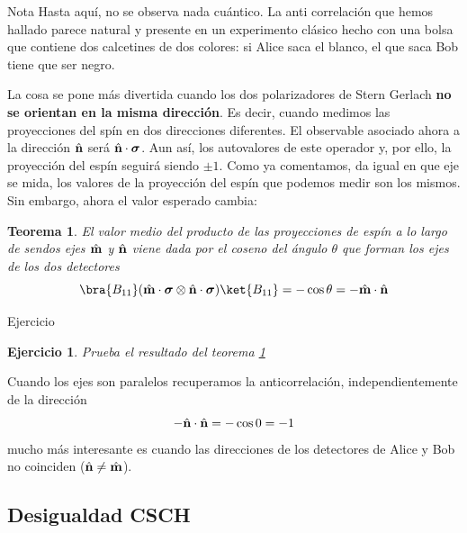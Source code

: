 \documentclass[a4paper,11pt]{book} %
\newtheorem{teorema_contador}{Teorema}
\newcommand{\Teorema}[1]{
		\begin{mybox_gray2}{}
			\begin{teorema_contador}
				 #1 
			\end{teorema_contador} 
		\end{mybox_gray2}
	}
\newtheorem{ejercicio_contador}{Ejercicio}
\newcommand{\Ejercicio}[1]{
		\begin{mybox_gray}{Ejercicio} 
			\begin{ejercicio_contador}
				 #1 
			\end{ejercicio_contador} 
		\end{mybox_gray}
	}
\numberwithin{equation}{chapter}
\begin{document}
	
	\begin{mybox_blue}{Nota }
	Hasta aquí, no se observa nada cuántico. La anti correlación que hemos hallado parece natural y presente en un 
	experimento clásico hecho con una bolsa que contiene dos calcetines de dos colores: si Alice saca el blanco, 
	el que saca Bob tiene que ser negro.
	\end{mybox_blue}

La cosa se pone más divertida cuando los dos polarizadores de Stern Gerlach \textbf{no se orientan en la misma dirección}. Es decir, cuando medimos las proyecciones del spín en dos direcciones diferentes. El observable asociado ahora a la dirección $\hat{\bf n}$  será  $\hat{\bf n}\cdot \boldsymbol{\sigma}$. Aun así, los autovalores de este operador y, por ello, la proyección del espín seguirá siendo $\pm 1$. Como ya comentamos, da igual en que eje se mida, los valores de la proyección del espín que podemos medir son los mismos. Sin embargo, ahora el valor esperado cambia:

	\Teorema{ \label{teorema_entrelazamiento_bell}
	El valor medio del producto de las proyecciones de espín a lo largo de sendos ejes $\hat{\bf m}$ y 
	$\hat{\bf n}$ viene dada por el coseno del ángulo $\theta$  que forman los  ejes de los dos detectores     
	\begin{equation}
	\bra{B_{11}}(\hat{\bf m}\cdot \boldsymbol{\sigma}\otimes \hat{\bf n}\cdot \boldsymbol{\sigma})\ket{B_{11}}
	= -\cos \theta = - \hat{\bf m}\cdot \hat{\bf n}
	\end{equation} 
	}
	
	\Ejercicio{
	Prueba el resultado del teorema \ref{teorema_entrelazamiento_bell}
	}

Cuando los ejes son paralelos recuperamos la  anticorrelación, independientemente de la dirección
\begin{equation}
-\hat{\bf n}\cdot \hat{\bf n} = - \cos 0 = -1 
\end{equation}
mucho más interesante es cuando las direcciones de los detectores de Alice y Bob no coinciden ($\hat{\bf n} \neq \hat{\bf m}$).



        \subsection{Desigualdad CSCH}
\end{document}
